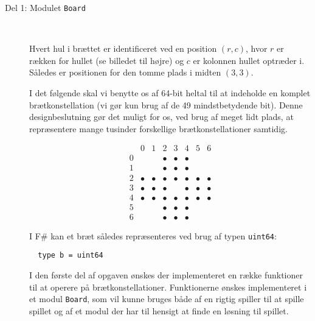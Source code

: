 \begin{description}
\item[Del 1: Modulet \texttt{Board}]~\\
  \begin{minipage}{0.65\linewidth}
  Hvert hul i brættet er identificeret ved en position $(r,c)$, hvor $r$ er rækken for hullet (se billedet til højre) og $c$ er kolonnen hullet optræder i. Således er positionen for den tomme plads i midten $(3,3)$.

  I det følgende skal vi benytte os af 64-bit heltal til at indeholde en komplet brætkonstellation (vi gør kun brug af de 49 mindstbetydende bit). Denne designbeslutning gør det muligt for os, ved brug af meget lidt plads, at repræsentere mange tusinder forskellige brætkonstellationer samtidig.  
  \end{minipage}\hfill
  \begin{minipage}{0.3\linewidth}
    \[
      \begin{array}{r|c|c|c|c|c|c|c}
        & 0 & 1 & 2 & 3 & 4 & 5 & 6 \\ \hline
        0 & & & \bullet & \bullet & \bullet & & \\ \hline
        1 & & & \bullet & \bullet & \bullet & & \\ \hline
        2 & \bullet & \bullet & \bullet & \bullet & \bullet & \bullet & \bullet \\ \hline
        3 & \bullet & \bullet & \bullet &  & \bullet & \bullet & \bullet \\ \hline
        4 & \bullet & \bullet & \bullet & \bullet & \bullet & \bullet & \bullet \\ \hline
        5 & & & \bullet & \bullet & \bullet & & \\ \hline
        6 & & & \bullet & \bullet & \bullet & &
      \end{array}
    \]   
  \end{minipage}

I F\# kan et bræt således repræsenteres ved brug af typen \lstinline{uint64}:
\begin{lstlisting}
  type b = uint64
\end{lstlisting}

I den første del af opgaven ønskes der implementeret en række funktioner til at operere på brætkonstellationer. Funktionerne ønskes implementeret i et modul \lstinline{Board}, som vil kunne bruges både af en rigtig spiller til at spille spillet og af et modul der har til hensigt at finde en løsning til spillet.


\end{description}
